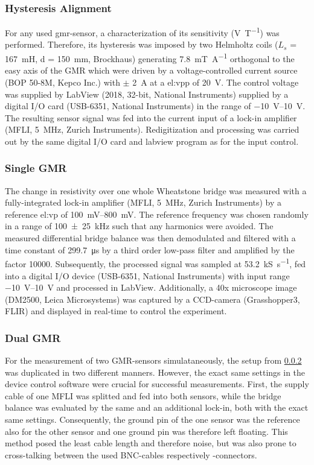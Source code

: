 \subsubsection{Hysteresis Alignment}
For any used \gls{gmr}-sensor, a characterization of its sensitivity (\si{\volt\per\tesla})  was performed. Therefore, its hysteresis was imposed by two Helmholtz coils ($L_s$ = \SI{167}{\milli\henry}, d = \SI{150}{\milli\meter}, Brockhaus) generating \SI{7.8}{\milli\tesla\per\ampere} orthogonal to the easy axis of the GMR which were driven by a voltage-controlled current source (BOP 50-8M, Kepco Inc.) with $\pm$ \SI{2}{\ampere} at a \gls{el:vpp} of \SI{20}{\volt}. The control voltage was supplied by LabView (2018, 32-bit, National Instruments) supplied by a digital I/O card (USB-6351, National Instruments) in the range of \SIrange{-10}{10}{\volt}.
The resulting sensor signal was fed into the current input of a lock-in amplifier (MFLI, \SI{5}{\mega\hertz}, Zurich Instruments). %
Redigitization and processing was carried out by the same digital I/O card and labview program as for the input control.
\subsubsection{Single GMR} \label{sec:meth:singleGMR}
The change in resistivity over one whole Wheatstone bridge was measured with a fully-integrated lock-in amplifier (MFLI, \SI{5}{\mega\hertz}, Zurich Instruments) by a reference \gls{el:vp} of \SIrange{100}{800}{\milli\volt}. The reference frequency was chosen randomly in a range of \SI{100(25)}{\kHz} such that any harmonics were avoided. The measured differential bridge balance was then demodulated and filtered with a time constant of \SI{299.7}{\micro\second} by a third order low-pass filter and amplified by the factor \num{10000}. Subsequently, the processed signal was sampled at \SI{53.2}{\kilo\siemens\per\second}, fed into a digital I/O device (USB-6351, National Instruments) with input range \SIrange{-10}{10}{\volt} and processed in LabView.\newline
Additionally, a 40x microscope image (DM2500, Leica Microsystems) was captured by a CCD-camera (Grasshopper3, FLIR) and displayed in real-time to control the experiment.
\subsubsection{Dual GMR}
\label{sec:meth:dualGMR}
For the measurement of two GMR-sensors simulataneously, the setup from \ref{sec:meth:singleGMR} was duplicated in two different manners. However, the exact same settings in the device control software were crucial for successful measurements.  First, the supply cable of one MFLI was splitted and fed into both sensors, while the bridge balance was evaluated by the same and an additional lock-in, both with the exact same settings. Consequently, the ground pin of the one sensor was the reference also for the other sensor and one ground pin was therefore left floating. This method posed the least cable length and therefore noise, but was also prone to cross-talking between the used BNC-cables respectively -connectors. 

